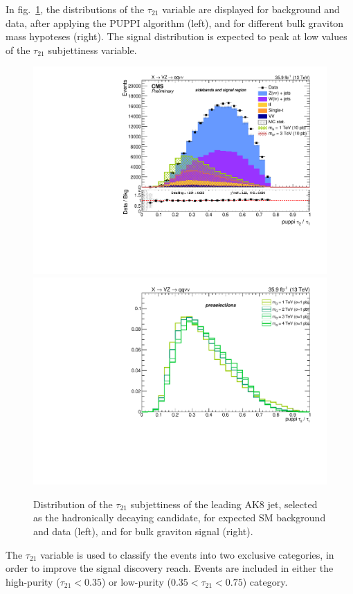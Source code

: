 \noindent In fig.~\ref{fig:fatjet_pre_tau21}, the distributions of the $\tau_{21}$ variable are displayed for background and data, after applying the PUPPI algorithm (left), and for different bulk graviton mass hypoteses (right). The signal distribution is expected to peak at low values of the $\tau_{21}$ subjettiness variable.

\begin{figure}[!htb]
  \begin{center}
    \includegraphics[width=.495\textwidth]{figures/FatJet1_puppiTau21.pdf}%
    \includegraphics[width=.495\textwidth]{plots/v9_thesis/XVZnnPre/FatJet1_puppiTau21_signalZZ.pdf}
  \end{center}
  \caption{Distribution of the $\tau_{21}$ subjettiness of the leading AK8 jet, selected as the hadronically decaying \V candidate, for expected SM background and data (left), and for bulk graviton signal (right).}
  \label{fig:fatjet_pre_tau21}
\end{figure}

\vspace*{1\baselineskip}

\noindent The $\tau_{21}$ variable is used to classify the events into two exclusive categories, in order to improve the signal discovery reach. Events are included in either the high-purity ($\tau_{21} < 0.35$) or low-purity ($0.35 < \tau_{21} < 0.75$) category.


